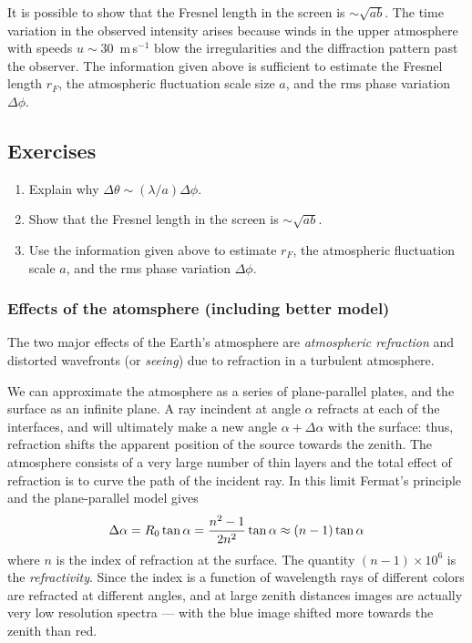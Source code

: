 \documentclass{article}
\begin{document}
It is possible to show that the Fresnel length in the screen is 
$\sim\sqrt{ab}$. The time variation in the observed intensity arises because 
winds in the upper atmosphere with speeds $u\sim 30$~m$\,$s$^{-1}$ blow 
the irregularities and the diffraction pattern past the observer. The 
information given above is sufficient to estimate the Fresnel length $r_{F}$, 
the atmospheric fluctuation scale size $a$, and the rms phase variation 
$\Delta\phi$.

\subsection*{Exercises}
\begin{enumerate}
\setcounter{enumi}{\value{count}}
\item Explain why $\Delta\theta\sim({\lambda/a})\Delta\phi$.
\item Show that the Fresnel length in the screen is $\sim\sqrt{ab}$. 
\item Use the information given above to estimate $r_F$, the atmospheric fluctuation
scale $a$, and the rms phase variation $\Delta\phi$.
\setcounter{count}{\value{enumi}}
\end{enumerate}

\subsubsection{Effects of the atomsphere (including better model)}

The two major effects of the Earth's atmosphere are {\it atmospheric
  refraction} and distorted wavefronts (or {\it seeing}) due to
refraction in a turbulent atmosphere.

We can approximate the atmosphere as a series of plane-parallel
plates, and the surface as an infinite plane. A ray incindent at angle
$\alpha$ refracts at each of the interfaces, and will ultimately make
a new angle $\alpha+\Delta\alpha$ with the surface: thus, refraction
shifts the apparent position of the source towards the zenith. The
atmosphere consists of a very large number of thin layers and the
total effect of refraction is to curve the path of the incident
ray. In this limit Fermat's principle and the plane-parallel model
gives 
\[
\Delta\alpha=R_0\tan{\alpha}={n^2-1\over 2n^2}\tan{\alpha}\approx
(n-1)\tan{\alpha}
\]
where $n$ is the index of refraction at the surface. The quantity
$(n-1)\times 10^6$ is the {\it refractivity}. Since the index is a
function of wavelength rays of different colors are refracted at
different angles, and at large zenith distances images are actually
very low resolution spectra --- with the blue image shifted more
towards the zenith than red.
\end{document}
